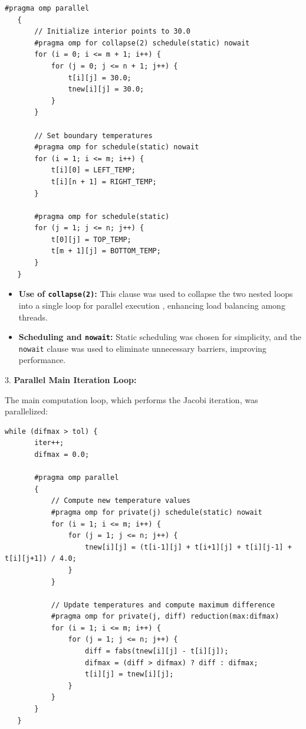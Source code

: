 \documentclass{article}
\begin{document}
   \begin{lstlisting}[style=CStyle, caption={Parallel Initialization}]
   #pragma omp parallel
   {
       // Initialize interior points to 30.0
       #pragma omp for collapse(2) schedule(static) nowait
       for (i = 0; i <= m + 1; i++) {
           for (j = 0; j <= n + 1; j++) {
               t[i][j] = 30.0;
               tnew[i][j] = 30.0;
           }
       }

       // Set boundary temperatures
       #pragma omp for schedule(static) nowait
       for (i = 1; i <= m; i++) {
           t[i][0] = LEFT_TEMP;
           t[i][n + 1] = RIGHT_TEMP;
       }

       #pragma omp for schedule(static)
       for (j = 1; j <= n; j++) {
           t[0][j] = TOP_TEMP;
           t[m + 1][j] = BOTTOM_TEMP;
       }
   }
   \end{lstlisting}

    \begin{itemize}
        \item \textbf{Use of \texttt{collapse(2)}:} This clause was used to collapse the two nested loops into a single loop for parallel execution \parencite{openmp}, enhancing load balancing among threads.
        \item \textbf{Scheduling and \texttt{nowait}:} Static scheduling was chosen for simplicity, and the \texttt{nowait} clause was used to eliminate unnecessary barriers, improving performance.
    \end{itemize}

3. \textbf{Parallel Main Iteration Loop:}

   The main computation loop, which performs the Jacobi iteration, was parallelized:

   \begin{lstlisting}[style=CStyle, caption={Parallel Main Iteration Loop}]
   while (difmax > tol) {
       iter++;
       difmax = 0.0;

       #pragma omp parallel
       {
           // Compute new temperature values
           #pragma omp for private(j) schedule(static) nowait
           for (i = 1; i <= m; i++) {
               for (j = 1; j <= n; j++) {
                   tnew[i][j] = (t[i-1][j] + t[i+1][j] + t[i][j-1] + t[i][j+1]) / 4.0;
               }
           }

           // Update temperatures and compute maximum difference
           #pragma omp for private(j, diff) reduction(max:difmax)
           for (i = 1; i <= m; i++) {
               for (j = 1; j <= n; j++) {
                   diff = fabs(tnew[i][j] - t[i][j]);
                   difmax = (diff > difmax) ? diff : difmax;
                   t[i][j] = tnew[i][j];
               }
           }
       }
   }
   \end{lstlisting}
\end{document}
